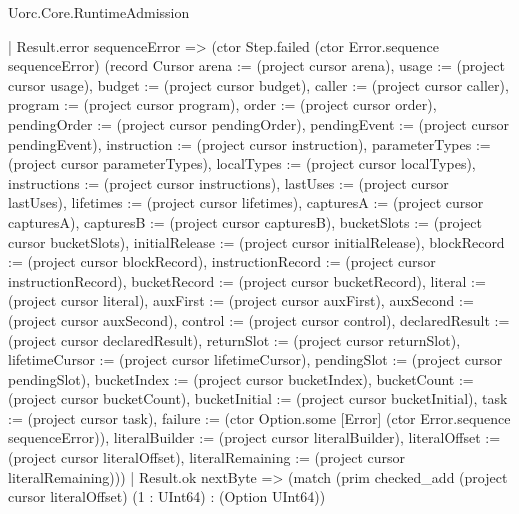 \begin{lexlean}{Uorc.Core.RuntimeAdmission}
\begin{semanticmodule}
{            | Result.error sequenceError => (ctor Step.failed (ctor Error.sequence sequenceError) (record Cursor {arena := (project cursor arena), usage := (project cursor usage), budget := (project cursor budget), caller := (project cursor caller), program := (project cursor program), order := (project cursor order), pendingOrder := (project cursor pendingOrder), pendingEvent := (project cursor pendingEvent), instruction := (project cursor instruction), parameterTypes := (project cursor parameterTypes), localTypes := (project cursor localTypes), instructions := (project cursor instructions), lastUses := (project cursor lastUses), lifetimes := (project cursor lifetimes), capturesA := (project cursor capturesA), capturesB := (project cursor capturesB), bucketSlots := (project cursor bucketSlots), initialRelease := (project cursor initialRelease), blockRecord := (project cursor blockRecord), instructionRecord := (project cursor instructionRecord), bucketRecord := (project cursor bucketRecord), literal := (project cursor literal), auxFirst := (project cursor auxFirst), auxSecond := (project cursor auxSecond), control := (project cursor control), declaredResult := (project cursor declaredResult), returnSlot := (project cursor returnSlot), lifetimeCursor := (project cursor lifetimeCursor), pendingSlot := (project cursor pendingSlot), bucketIndex := (project cursor bucketIndex), bucketCount := (project cursor bucketCount), bucketInitial := (project cursor bucketInitial), task := (project cursor task), failure := (ctor Option.some [Error] (ctor Error.sequence sequenceError)), literalBuilder := (project cursor literalBuilder), literalOffset := (project cursor literalOffset), literalRemaining := (project cursor literalRemaining)}))
            | Result.ok nextByte => (match (prim checked_add (project cursor literalOffset) (1 : UInt64) : (Option UInt64))
}
\end{semanticmodule}
\end{lexlean}
